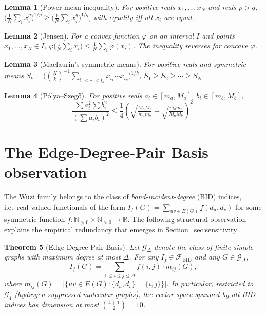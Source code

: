 \documentclass[11pt,a4paper]{article}
\newtheorem{theorem}{Theorem}[section]
\newtheorem{lemma}[theorem]{Lemma}
\theoremstyle{definition}
\newcommand{\bid}{\mathcal{F}_{\mathrm{BID}}}
\begin{document}
\begin{lemma}[Power-mean inequality]\label{lem:pm}
For positive reals $x_1,\ldots,x_N$ and reals $p>q$,
\(\bigl(\frac{1}{N}\sum_i x_i^p\bigr)^{1/p}\ge
\bigl(\frac{1}{N}\sum_i x_i^q\bigr)^{1/q}\),
with equality iff all $x_i$ are equal.
\end{lemma}

\begin{lemma}[Jensen]\label{lem:jensen}
For a convex function $\varphi$ on an interval $I$ and points
$x_1,\ldots,x_N\in I$,
\(\varphi\!\bigl(\frac{1}{N}\sum_i x_i\bigr)\le \frac{1}{N}\sum_i\varphi(x_i)\).
The inequality reverses for concave $\varphi$.
\end{lemma}

\begin{lemma}[Maclaurin's symmetric means]\label{lem:maclaurin}
For positive reals and symmetric means
$S_k=\bigl(\binom{N}{k}^{-1}\sum_{i_1<\cdots<i_k}x_{i_1}\cdots x_{i_k}\bigr)^{1/k}$,
$S_1\ge S_2\ge\cdots\ge S_N$.
\end{lemma}

\begin{lemma}[P\'olya--Szeg\H{o}]\label{lem:ps}
For positive reals $a_i\in[m_a,M_a]$, $b_i\in[m_b,M_b]$,
\[
\frac{\sum a_i^2 \sum b_i^2}{(\sum a_i b_i)^2}
\le \frac{1}{4}\left(\sqrt{\tfrac{M_a M_b}{m_a m_b}}+\sqrt{\tfrac{m_a m_b}{M_a M_b}}\right)^{\!2}.
\]
\end{lemma}

\section{The Edge-Degree-Pair Basis observation}\label{sec:bid}

The Wuzi family belongs to the class of \emph{bond-incident-degree}
(BID) indices, i.e.\ real-valued functionals of the form
$I_f(G)=\sum_{uv\in E(G)} f(d_u,d_v)$ for some symmetric function
$f:\mathbb{N}_{>0}\times\mathbb{N}_{>0}\to\mathbb{R}$. The
following structural observation explains the empirical
redundancy that emerges in Section~\ref{sec:sensitivity}.

\begin{theorem}[Edge-Degree-Pair Basis]\label{thm:bid}
Let $\mathcal{G}_\Delta$ denote the class of finite simple graphs
with maximum degree at most $\Delta$. For any
$I_f\in\bid$ and any $G\in\mathcal{G}_\Delta$,
\begin{equation}\label{eq:bid_linear}
I_f(G) = \sum_{1\le i\le j\le \Delta} f(i,j)\cdot m_{ij}(G),
\end{equation}
where $m_{ij}(G)=\bigl|\{uv\in E(G):\{d_u,d_v\}=\{i,j\}\}\bigr|$.
In particular, restricted to $\mathcal{G}_4$ (hydrogen-suppressed
molecular graphs), the vector space spanned by all BID indices has
dimension at most $\binom{4+1}{2}=10$.
\end{theorem}
\end{document}
